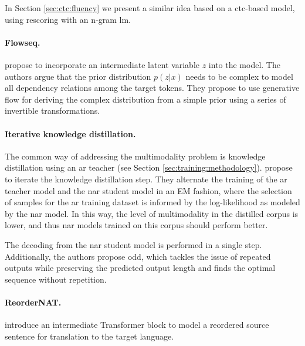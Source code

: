 In Section \ref{sec:ctc:fluency} we present a similar idea based on a
\ac{ctc}-based model, using rescoring with an n-gram \acl{lm}.

\paragraph{Flowseq.} %
\citet{ma-etal-2019-flowseq} propose to incorporate an intermediate latent
variable $z$ into the model. The authors argue that the prior distribution
$p(z|x)$ needs to be complex to model all dependency relations among the target
tokens. They propose to use generative flow \citep{rezende2015variational} for
deriving the complex distribution from a simple prior using a series of
invertible transformations.

\paragraph{Iterative knowledge distillation.}
The common way of addressing the multimodality problem is knowledge
distillation using an \acl{ar} teacher (see Section
\ref{sec:training:methodology}).  \citet{sun2020em} propose to iterate the
knowledge distillation step. They alternate the training of the \ac{ar} teacher
model and the \ac{nar} student model in an EM fashion, where the selection of
samples for the \ac{ar} training dataset is informed by the log-likelihood as
modeled by the \ac{nar} model. In this way, the level of multimodality in the
distilled corpus is lower, and thus \ac{nar} models trained on this corpus
should perform better.

The decoding from the \ac{nar} student model is performed in a single step.
Additionally, the authors propose \acf{odd}, which tackles the issue of
repeated outputs while preserving the predicted output length and finds the
optimal sequence without repetition.

\paragraph{ReorderNAT.} \citet{ran-etal-2021-guiding} introduce an intermediate
Transformer block to model a reordered source sentence for translation to the
target language.

